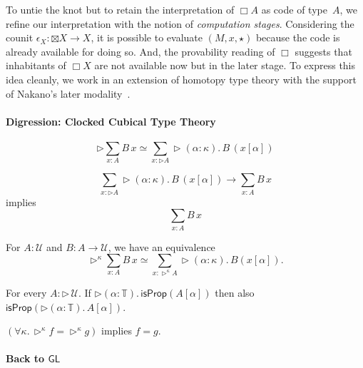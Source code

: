 \documentclass[a4paper,UKenglish,numberwithinsect,cleveref,thm-restate]{lipics-v2021}
\newcommand{\eqv}[2]{\ensuremath{#1 \simeq #2}\xspace}
\newcommand{\Univ}{\mathcal{U}}
\theoremstyle{plain}
\begin{document}
To untie the knot but to retain the interpretation of $\Box A$ as code of type~$A$, we refine our interpretation with the notion of \emph{computation stages}. 
Considering the counit $\epsilon_X\colon \boxtimes X \to X$, it is possible to evaluate $(M, x, \star)$ because the code is already available for doing so.
And, the provability reading of $\Box$ suggests that inhabitants of $\Box X$ are not available now but in the later stage.
To express this idea cleanly, we work in an extension of homotopy type theory with the support of Nakano's later modality~\cite{Nakano2000}.

\paragraph*{Digression: Clocked Cubical Type Theory}
\begin{lemma}
  \[
    \eqv{\rhd \sum_{x : A} B\,x}{\sum_{x : \rhd A} \rhd (\alpha : \kappa).\,B\,(x[\alpha])}
  \]
\end{lemma}

\begin{corollary}\label{coro:lob-induction-sum}
  \[
    \sum_{x : \rhd A} \rhd (\alpha : \kappa).\,B\,(x[\alpha]) \to \sum_{x : A} B\,x
  \]
  implies 
  \[
    \sum_{x : A} B\,x
  \]
\end{corollary}

\begin{definition}
\end{definition}
\begin{lemma}\label{lem:later-sum}
  For $A : \Univ$ and $B : A \to \Univ$, we have an equivalence
  \[
    \eqv{\rhd^\kappa\sum_{x : A} B\,x}{\sum_{x : \rhd^\kappa A} \rhd (\alpha : \kappa).\, B (x [\alpha])}.
  \]
\end{lemma}
\begin{lemma}\label{lem:proposition-closed-under-later}
  For every $A : \mathord{\rhd}\,\Univ$. If $\rhd (\alpha : \mathbb{T}).\,\mathsf{isProp}(A[\alpha])$ then also $\mathsf{isProp}(\rhd(\alpha : \mathbb{T}).\,A[\alpha])$. 
\end{lemma}

\begin{lemma}\label{lem:later-identity}
  $\left(\forall \kappa.\, \rhd^\kappa f = \rhd^\kappa g\right)$ implies $f = g$. 
\end{lemma}
\paragraph*{Back to \texorpdfstring{$\mathsf{GL}$}{GL}}
\end{document}
